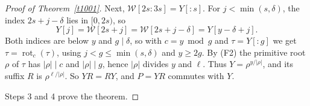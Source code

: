\begin{proof}[Proof of Theorem~\ref{t1001}]
Next, \(\mathcal W[2s{:}3s]=Y[{:}s]\). For \(j<\min(s,\delta)\), the index \(2s+j-\delta\) lies in \([0,2s)\), so
\[
 Y[j]=\mathcal W[2s+j]=\mathcal W[2s+j-\delta]=Y[y-\delta+j].
\]
Both indices are below \(y\) and \(g\mid\delta\), so with \(c=y\bmod g\) and \(\tau=Y[{:}g]\) we get \(\tau=\operatorname{rot}_c(\tau)\), using \(j<g\le\min(s,\delta)\) and \(y\ge2g\). By (F2) the primitive root \(\rho\) of \(\tau\) has \(|\rho|\mid c\) and \(|\rho|\mid g\), hence \(|\rho|\) divides \(y\) and \(\ell\). Thus \(Y=\rho^{y/|\rho|}\), and its suffix \(R\) is \(\rho^{\ell/|\rho|}\). So \(YR=RY\), and \(P=YR\) commutes with \(Y\).

Steps 3 and 4 prove the theorem.
\end{proof}
